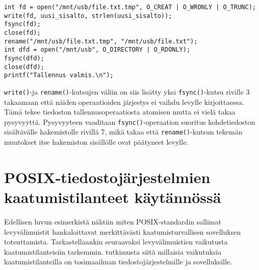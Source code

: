 \begin{verbatim}
int fd = open("/mnt/usb/file.txt.tmp", O_CREAT | O_WRONLY | O_TRUNC);
write(fd, uusi_sisalto, strlen(uusi_sisalto));
fsync(fd);
close(fd);
rename("/mnt/usb/file.txt.tmp", "/mnt/usb/file.txt");
int dfd = open("/mnt/usb", O_DIRECTORY | O_RDONLY);
fsync(dfd);
close(dfd);
printf("Tallennus valmis.\n");
\end{verbatim}
%
\texttt{write()}-ja \texttt{rename()}-kutsujen väliin on siis lisätty yksi \texttt{fsync()}-kutsu riville 3 takaamaan että näiden operaatioiden järjestys ei vaihdu levylle kirjoittaessa.
Tämä tekee tiedoston tallennusoperaatiosta atomisen mutta ei vielä takaa pysyvyyttä.
Pysyvyyteen vaaditaan \texttt{fsync()}-operaation suoritus kohdetiedoston sisältävälle hakemistolle rivillä 7,
mikä takaa että \texttt{rename()}-kutsun tekemän muutokset itse hakemiston sisällölle ovat päätyneet levylle.

\section{POSIX-tiedostojärjestelmien kaatumistilanteet käytännössä}
\label{ChapPosixSafetyStudy}
Edellisen luvun esimerkistä nähtiin miten POSIX-standardin sallimat levyvälimuistit hankaloittavat merkittävästi kaatumisturvallisen sovelluksen toteuttamista.
Tarkastellaankin seuraavaksi levyvälimuistien vaikutusta kaatumistilanteisiin tarkemmin.
tutkimusta siitä millaisia vaikutuksia kaatumistilanteilla on tosimaailman tiedostojärjestelmille ja sovelluksille.

